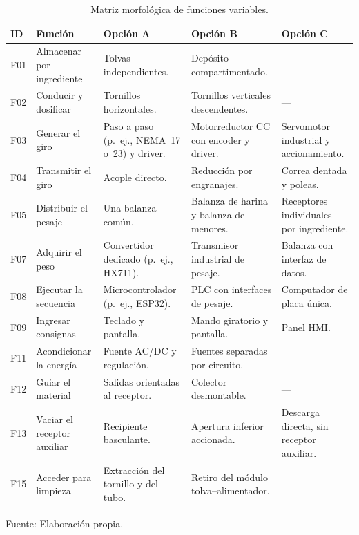 \begin{table}[H]
    \centering
    \caption{Matriz morfológica de funciones variables.}
    \label{tab:funciones_variables}
    \footnotesize
    \setlength{\tabcolsep}{2.5pt}
    \renewcommand{\arraystretch}{1.15}
    \begin{tabularx}{\textwidth}{p{}>{\raggedright\arraybackslash}p{}*{3}{>{\raggedright\arraybackslash}X}}
        \toprule
        \textbf{ID} & \textbf{Función} & \textbf{Opción A} & \textbf{Opción B} & \textbf{Opción C} \\
        \midrule
        F01 & Almacenar por ingrediente & Tolvas independientes. & Depósito compartimentado. & --- \\
        \addlinespace[2pt]
        F02 & Conducir y dosificar & Tornillos horizontales. & Tornillos verticales descendentes. & --- \\
        \addlinespace[2pt]
        F03 & Generar el giro & Paso a paso (p.~ej., NEMA~17 o~23) y driver. & Motorreductor CC con encoder y driver. & Servomotor industrial y accionamiento. \\
        \addlinespace[2pt]
        F04 & Transmitir el giro & Acople directo. & Reducción por engranajes. & Correa dentada y poleas. \\
        \addlinespace[2pt]
        F05 & Distribuir el pesaje & Una balanza común. & Balanza de harina y balanza de menores. & Receptores individuales por ingrediente. \\
        \addlinespace[2pt]
        F07 & Adquirir el peso & Convertidor dedicado (p.~ej., HX711). & Transmisor industrial de pesaje. & Balanza con interfaz de datos. \\
        \addlinespace[2pt]
        F08 & Ejecutar la secuencia & Microcontrolador (p.~ej., ESP32). & PLC con interfaces de pesaje. & Computador de placa única. \\
        \addlinespace[2pt]
        F09 & Ingresar consignas & Teclado y pantalla. & Mando giratorio y pantalla. & Panel HMI. \\
        \addlinespace[2pt]
        F11 & Acondicionar la energía & Fuente AC/DC y regulación. & Fuentes separadas por circuito. & --- \\
        \addlinespace[2pt]
        F12 & Guiar el material & Salidas orientadas al receptor. & Colector desmontable. & --- \\
        \addlinespace[2pt]
        F13 & Vaciar el receptor auxiliar & Recipiente basculante. & Apertura inferior accionada. & Descarga directa, sin receptor auxiliar. \\
        \addlinespace[2pt]
        F15 & Acceder para limpieza & Extracción del tornillo y del tubo. & Retiro del módulo tolva--alimentador. & --- \\
        \bottomrule
    \end{tabularx}
    \par\smallskip
    Fuente: Elaboración propia.
\end{table}

